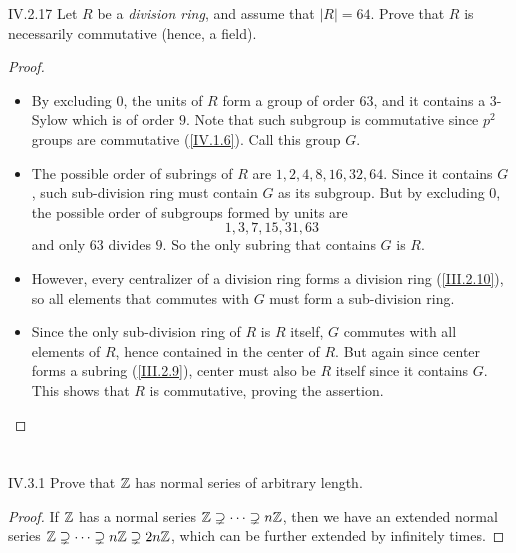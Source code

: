 \begin{problem}{IV.2.17}
Let $R$ be a \emph{division ring}, and assume that $|R| = 64$. Prove that $R$ is necessarily commutative (hence, a field).
\end{problem}
\begin{proof} \
\begin{itemize}
\setlength\itemsep{0pt}
\item By excluding $0$, the units of $R$ form a group of order 63, and it contains a $3$-Sylow which is of order $9$. Note that such subgroup is commutative since $p^2$ groups are commutative (\ref{IV.1.6}). Call this group $G$.
\item The possible order of subrings of $R$ are $1,2,4,8,16,32,64$. Since it contains $G$, such sub-division ring must contain $G$ as its subgroup. But by excluding $0$, the possible order of subgroups formed by units are 
\[
1,3,7,15,31,63
\]
and only $63$ divides $9$. So the only subring that contains $G$ is $R$.
\item However, every centralizer of a division ring forms a division ring (\ref{III.2.10}), so all elements that commutes with $G$ must form a sub-division ring.
\item Since the only sub-division ring of $R$ is $R$ itself, $G$ commutes with all elements of $R$, hence contained in the center of $R$. But again since center forms a subring (\ref{III.2.9}), center must also be $R$ itself since it contains $G$. This shows that $R$ is commutative, proving the assertion. 
\end{itemize}
\end{proof}

\section{}

\begin{problem}{IV.3.1}
Prove that $\mathbb{Z}$ has normal series of arbitrary length.
\end{problem}
\begin{proof}
If $\mathbb{Z}$ has a normal series $\mathbb{Z} \supsetneq \cdots \supsetneq n\mathbb{Z}$, then we have an extended normal series $\mathbb{Z} \supsetneq \cdots \supsetneq n\mathbb{Z} \supsetneq 2n\mathbb{Z}$, which can be further extended by infinitely times.
\end{proof}

